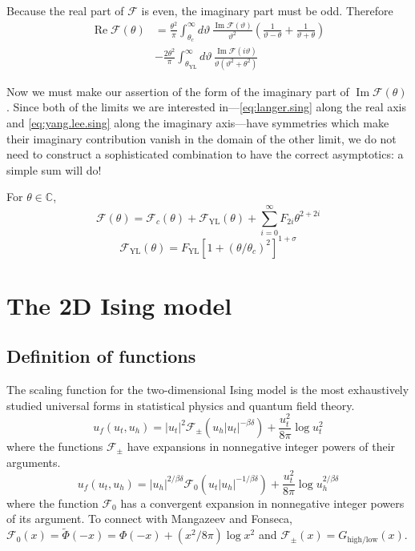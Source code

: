 \documentclass[
  aps,
  pre,
  preprint,
  longbibliography,
  floatfix
]{revtex4-2}
\begin{document}
Because the real part of $\mathcal F$ is even, the imaginary part must be odd. Therefore
\begin{equation}
  \begin{aligned}
    \operatorname{Re}\mathcal F(\theta)
    &=\frac{\theta^2}{\pi}
    \int_{\theta_c}^\infty d\vartheta\,\frac{\operatorname{Im}\mathcal F(\vartheta)}{\vartheta^2}\left(\frac1{\vartheta-\theta}+\frac1{\vartheta+\theta}\right) \\
    &-\frac{2\theta^2}\pi\int_{\theta_{\mathrm{YL}}}^{\infty}d\vartheta\,\frac{\operatorname{Im}\mathcal F(i\vartheta)}{\vartheta(\vartheta^2+\theta^2)}
  \end{aligned}
\end{equation}

Now we must make our assertion of the form of the imaginary part of $\operatorname{Im}\mathcal F(\theta)$. Since both of the limits we are interested in---\eqref{eq:langer.sing} along the real axis and \eqref{eq:yang.lee.sing} along the imaginary axis---have symmetries which make their imaginary contribution vanish in the domain of the other limit, we do not need to construct a sophisticated combination to have the correct asymptotics: a simple sum will do!

For $\theta\in\mathbb C$,
\begin{equation}
  \mathcal F(\theta)=\mathcal F_c(\theta)+\mathcal F_{\mathrm{YL}}(\theta)+\sum_{i=0}^\infty F_{2i}\theta^{2+2i}
\end{equation}
\begin{equation}
  \mathcal F_{\mathrm{YL}}(\theta)=F_{\mathrm{YL}}[1+(\theta/\theta_c)^2]^{1+\sigma}
\end{equation}

\section{The 2D Ising model}

\subsection{Definition of functions}

The scaling function for the two-dimensional Ising model is the most
exhaustively studied universal forms in statistical physics and quantum field
theory.
\begin{equation} \label{eq:free.energy.2d.low}
  u_f(u_t, u_h)
  = |u_t|^2\mathcal F_{\pm}(u_h|u_t|^{-\beta\delta})
    +\frac{u_t^2}{8\pi}\log u_t^2
\end{equation}
where the functions $\mathcal F_\pm$ have expansions in nonnegative integer powers of their arguments.
\begin{equation} \label{eq:free.energy.2d.mid}
  u_f(u_t, u_h)
  = |u_h|^{2/\beta\delta}\mathcal F_0(u_t|u_h|^{-1/\beta\delta})
    +\frac{u_t^2}{8\pi}\log u_h^{2/\beta\delta}
\end{equation}
where the function $\mathcal F_0$ has a convergent expansion in nonnegative integer powers of its argument.
To connect with Mangazeev and Fonseca, $\mathcal F_0(x)=\tilde\Phi(-x)=\Phi(-x)+(x^2/8\pi) \log x^2$ and $\mathcal F_\pm(x)=G_{\mathrm{high}/\mathrm{low}}(x)$.
\end{document}

